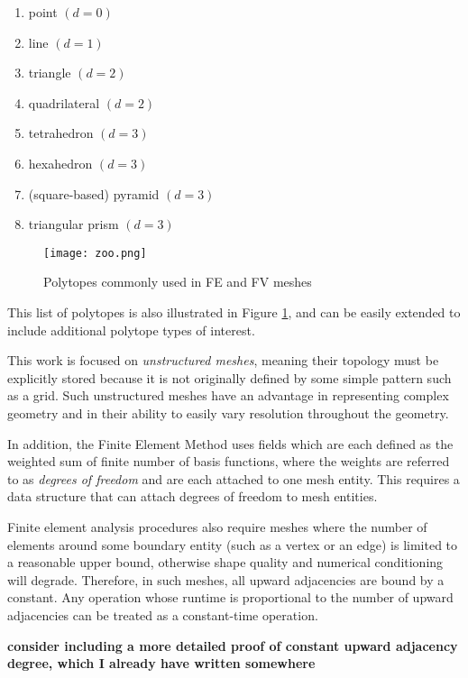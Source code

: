 \begin{enumerate}
\item point $(d = 0)$
\item line $(d = 1)$
\item triangle $(d = 2)$
\item quadrilateral $(d = 2)$
\item tetrahedron $(d = 3)$
\item hexahedron $(d = 3)$
\item (square-based) pyramid $(d = 3)$
\item triangular prism $(d = 3)$
\end{enumerate}

\begin{figure}
\begin{center}
\texttt{[image: zoo.png]}
\caption{Polytopes commonly used in FE and FV meshes}
\label{fig:zoo}
\end{center}
\end{figure}

This list of polytopes is also illustrated in Figure
\ref{fig:zoo}, and
can be easily extended to include additional polytope
types of interest.

This work is focused on \emph{unstructured meshes}, meaning
their topology must be explicitly stored because it
is not originally defined by some simple pattern such as a grid.
Such unstructured meshes have an
advantage in representing complex geometry and in their
ability to easily vary resolution throughout the geometry.

In addition, the Finite Element Method uses fields which are each defined
as the weighted sum of finite number of basis functions,
where the weights are referred to as \emph{degrees of freedom} and are each
attached to one mesh entity.
This requires a data structure that can attach
degrees of freedom to mesh entities.

Finite element analysis procedures also require meshes where
the number of elements around some boundary entity (such as a vertex
or an edge) is limited to a reasonable upper bound,
otherwise shape quality and numerical conditioning will degrade.
Therefore, in such meshes, all upward adjacencies are bound
by a constant.
Any operation whose runtime is proportional to the
number of upward adjacencies can be treated as a constant-time operation.

{\bf consider including a more detailed proof of constant upward
adjacency degree, which I already have written somewhere}


